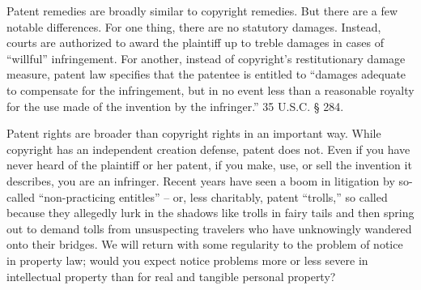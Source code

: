 \item Patent remedies are broadly similar to copyright remedies. But there are a
few notable differences. For one thing, there are no statutory damages.
Instead, courts are authorized to award the plaintiff up to treble damages in
cases of ``willful'' infringement. For another, instead of copyright's
restitutionary damage measure, patent law specifies that the patentee is
entitled to ``damages adequate to compensate for the infringement, but in no
event less than a reasonable royalty for the use made of the invention by the
infringer.'' 35 U.S.C. {\S} 284. 


\item Patent rights are broader than copyright rights in an important way. While
copyright has an independent creation defense, patent does not. Even if you
have never heard of the plaintiff or her patent, if you make, use, or sell the
invention it describes, you are an infringer. Recent years have seen a boom in
litigation by so-called ``non-practicing entitles'' -- or, less charitably,
patent ``trolls,'' so called because they allegedly lurk in the shadows like
trolls in fairy tails and then spring out to demand tolls from unsuspecting
travelers who have unknowingly wandered onto their bridges. We will return with
some regularity to the problem of notice in property law; would you expect
notice problems more or less severe in intellectual property than for real and
tangible personal property?

